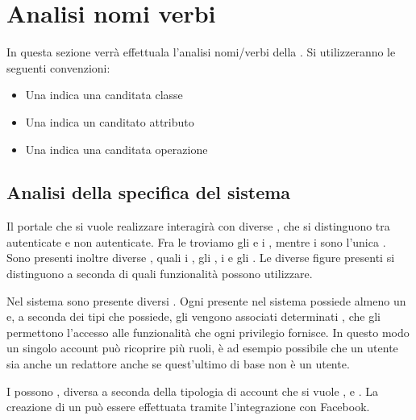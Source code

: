 %


\section{Analisi nomi verbi} 
In questa sezione verrà effettuala l'analisi nomi/verbi della .
Si utilizzeranno le seguenti convenzioni:
\begin{itemize}
	\item Una  indica una canditata classe
	\item Una  indica un canditato attributo
	\item Una  indica una canditata operazione
\end{itemize}

\subsection{Analisi della specifica del sistema} 
Il portale che si vuole realizzare interagirà con diverse , che si distinguono tra autenticate e non autenticate. Fra le  troviamo gli  e i , mentre i  sono l'unica .
Sono presenti inoltre diverse , quali i , gli , i  e gli .
Le diverse figure presenti si distinguono a seconda di quali funzionalità possono utilizzare. 

\bigskip
\noindent

Nel sistema sono presente diversi .
Ogni  presente nel sistema possiede almeno un  e, a seconda dei tipi che possiede, gli vengono associati determinati , che gli permettono l'accesso alle funzionalità che ogni privilegio fornisce. In questo modo un singolo account può ricoprire più ruoli, è ad esempio possibile che un utente sia anche un redattore anche se quest'ultimo di base non è un utente.

I  possono , diversa a seconda della tipologia di account che si vuole , e . La creazione di un   può essere effettuata tramite l'integrazione con Facebook.

